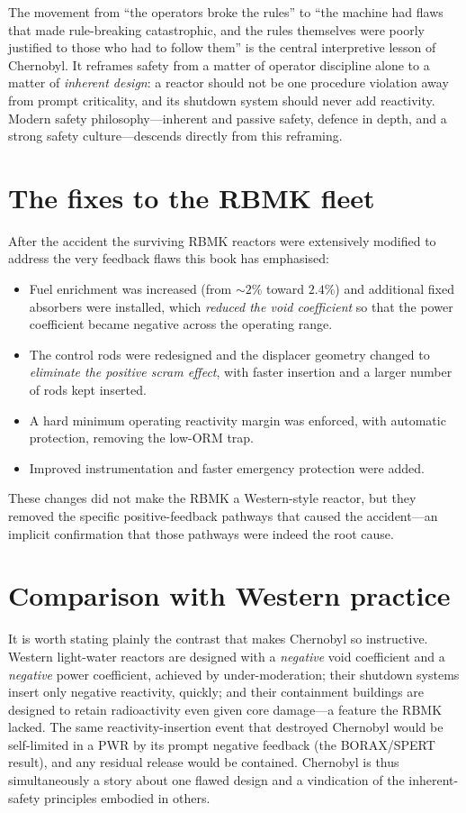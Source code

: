 \begin{remark}
The movement from ``the operators broke the rules'' to ``the machine had flaws
that made rule-breaking catastrophic, and the rules themselves were poorly
justified to those who had to follow them'' is the central interpretive lesson of
Chernobyl. It reframes safety from a matter of operator discipline alone to a
matter of \emph{inherent design}: a reactor should not be one procedure violation
away from prompt criticality, and its shutdown system should never add reactivity.
Modern safety philosophy---inherent and passive safety, defence in depth, and a
strong safety culture---descends directly from this reframing.
\end{remark}

\section{The fixes to the RBMK fleet}

After the accident the surviving RBMK reactors were extensively modified to address
the very feedback flaws this book has emphasised:
\begin{itemize}[nosep]
\item Fuel enrichment was increased (from $\sim 2\%$ toward $2.4\%$) and additional
fixed absorbers were installed, which \emph{reduced the void coefficient} so that
the power coefficient became negative across the operating range.
\item The control rods were redesigned and the displacer geometry changed to
\emph{eliminate the positive scram effect}, with faster insertion and a larger
number of rods kept inserted.
\item A hard minimum operating reactivity margin was enforced, with automatic
protection, removing the low-ORM trap.
\item Improved instrumentation and faster emergency protection were added.
\end{itemize}
These changes did not make the RBMK a Western-style reactor, but they removed the
specific positive-feedback pathways that caused the accident---an implicit
confirmation that those pathways were indeed the root cause.

\section{Comparison with Western practice}

It is worth stating plainly the contrast that makes Chernobyl so instructive.
Western light-water reactors are designed with a \emph{negative} void coefficient
and a \emph{negative} power coefficient, achieved by under-moderation; their
shutdown systems insert only negative reactivity, quickly; and their containment
buildings are designed to retain radioactivity even given core damage---a feature
the RBMK lacked. The same reactivity-insertion event that destroyed Chernobyl would
be self-limited in a PWR by its prompt negative feedback (the BORAX/SPERT result),
and any residual release would be contained. Chernobyl is thus simultaneously a
story about one flawed design and a vindication of the inherent-safety principles
embodied in others.

